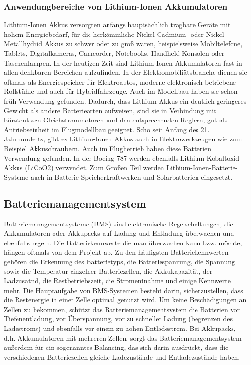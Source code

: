 \subsubsection{Anwendungbereiche von Lithium-Ionen Akkumulatoren}
Lithium-Ionen Akkus versorgten anfangs hauptsächlich tragbare Geräte mit hohem Energiebedarf, für die herkömmliche Nickel-Cadmium- oder Nickel-Metallhydrid Akkus zu schwer oder zu groß waren, beispielsweise Mobiltelefone, Tablets, Digitalkameras, Camcorder, Notebooks, Handheld-Konsolen oder Taschenlampen. In der heutigen Zeit sind Lithium-Ionen Akkumulatoren fast in allen denkbaren Bereichen aufzufinden. In der Elektromobiliätsbranche dienen sie oftmals als Energiespeicher für Elektroautos, moderne elektronisch betriebene Rollstühle und auch für Hybridfahrzeuge. Auch im Modellbau haben sie schon früh Verwendung gefunden. Dadurch, dass Lithium Akkus ein deutlich geringeres Gewicht als andere Batteriearten aufweisen, sind sie in Verbindung mit bürstenlosen Gleichstrommotoren und den entsprechenden Reglern, gut als Antriebseinheit im Flugmodellbau geeignet. Scho seit Anfang des 21. Jahrhunderts, gibt es Lithium-Ionen Akkus auch in Elektrowerkzeugen wie zum Beispiel Akkuschraubern. Auch im Flugbetrieb haben diese Batterien Verwendung gefunden. In der Boeing 787 werden ebenfalls Lithium-Kobaltoxid-Akkus (LiCoO2) verwendet. Zum Großen Teil werden Lithium-Ionen-Batterie-Systeme auch in Batterie-Speicherkraftwerken und Solarbatterien eingesetzt.
\newpage


\subsection{Batteriemanagementsystem}
\label{Batteriemanagementsystem}
Batteriemanagementsysteme (BMS) sind elektronische Regelschaltungen, die Akkumulatoren oder Akkupacks auf Ladung und Entladung überwachen und ebenfalls regeln. Die Batteriekennwerte die man überwachen kann bzw. möchte, hängen oftmals von dem Projekt ab. Zu den häufigsten Batteriekennwerten gehören die Erkennung des Batterietyps, die Batteriespannung, die Spannung sowie die Temperatur einzelner Batteriezellen, die Akkukapazität, der Ladzusatnd, die Restbetriebszeit, die Stromentnahme und einige Kennwerte mehr. Die Hauptaufgabe von BMS-Systemen besteht darin, sicherzustellen, dass die Restenergie in einer Zelle optimal genutzt wird. Um keine Beschädigungen an Zellen zu bekommen, schützt das Batteriemanagementsystem die Batterien vor Tiefenentladung, vor Überspannung, vor zu schneller Ladung (begrenzen des Ladestroms) und ebenfalls vor einem zu hohen Entladestrom. Bei Akkupacks, d.h. Akkumulatoren mit mehreren Zellen, sorgt das Batteriemanagementsystem außerdem für ein sogenanntes Balancing, das sich darin ausdrückt, dass die verschiedenen Batteriezellen gleiche Ladezustände und Entladezustände haben.

